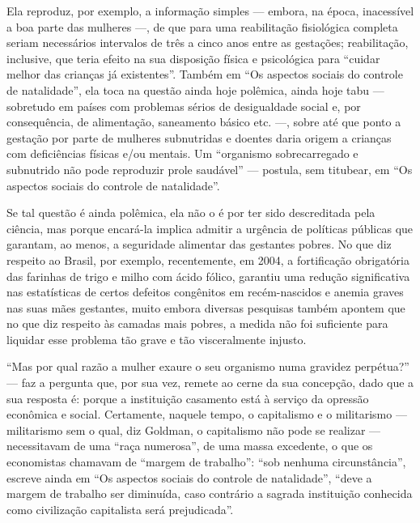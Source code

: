 Ela reproduz, por exemplo, a informação simples
--- embora, na época, inacessível a boa parte das mulheres ---, de que
para uma reabilitação fisiológica completa seriam necessários intervalos
de três a cinco anos entre as gestações; reabilitação, inclusive, que
teria efeito na sua disposição física e psicológica para ``cuidar melhor
das crianças já existentes''. Também em ``Os aspectos sociais do
controle de natalidade'', ela toca na questão ainda hoje polêmica, ainda
hoje tabu --- sobretudo em países com problemas sérios de desigualdade
social e, por consequência, de alimentação, saneamento básico etc. ---,
sobre até que ponto a gestação por parte de mulheres subnutridas e
doentes daria origem a crianças com deficiências físicas e/ou mentais.
Um ``organismo sobrecarregado e subnutrido não pode reproduzir prole
saudável'' --- postula, sem titubear, em ``Os aspectos sociais do
controle de natalidade''. 

Se tal questão é ainda polêmica, ela
não o é por ter sido descreditada pela ciência, mas porque encará-la
implica admitir a urgência de políticas públicas que garantam, ao menos,
a seguridade alimentar das gestantes pobres. No que diz respeito ao
Brasil, por exemplo, recentemente, em 2004, a fortificação obrigatória
das farinhas de trigo e milho com ácido fólico, garantiu uma redução
significativa nas estatísticas de certos defeitos congênitos em
recém-nascidos e anemia graves nas suas mães gestantes, muito embora
diversas pesquisas também apontem que no que diz respeito às camadas
mais pobres, a medida não foi suficiente para liquidar esse problema tão
grave e tão visceralmente injusto.

``Mas por qual razão a mulher exaure o seu organismo numa gravidez
perpétua?'' --- faz a pergunta que, por sua vez, remete ao cerne da sua
concepção, dado que a sua resposta é: porque a instituição casamento
está à serviço da opressão econômica e social. Certamente, naquele
tempo, o capitalismo e o militarismo --- militarismo sem o qual, diz
Goldman, o capitalismo não pode se realizar --- necessitavam de uma
``raça numerosa'', de uma massa excedente, o que os economistas chamavam
de ``margem de trabalho'': ``sob nenhuma circunstância'', escreve ainda
em ``Os aspectos sociais do controle de natalidade'', ``deve a margem de
trabalho ser diminuída, caso contrário a sagrada instituição conhecida
como civilização capitalista será prejudicada''. 

